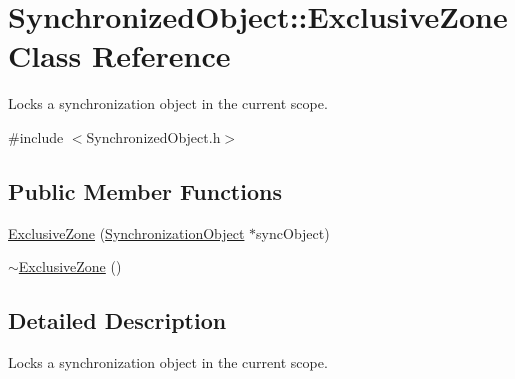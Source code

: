 \hypertarget{class_synchronized_object_1_1_exclusive_zone}{\section{Synchronized\-Object\-:\-:Exclusive\-Zone Class Reference}
\label{class_synchronized_object_1_1_exclusive_zone}
}


Locks a synchronization object in the current scope.  




{\ttfamily \#include $<$Synchronized\-Object.\-h$>$}

\subsection*{Public Member Functions}
\begin{DoxyCompactItemize}
\item 
\hyperlink{class_synchronized_object_1_1_exclusive_zone_ae4393b508828328c2f4816ff9b7b090c}{Exclusive\-Zone} (\hyperlink{class_synchronized_object_1_1_synchronization_object}{Synchronization\-Object} $\ast$sync\-Object)
\item 
\hyperlink{class_synchronized_object_1_1_exclusive_zone_a501678d50abfd678ff0ce0fc164c63d4}{$\sim$\-Exclusive\-Zone} ()
\end{DoxyCompactItemize}


\subsection{Detailed Description}
Locks a synchronization object in the current scope. 

